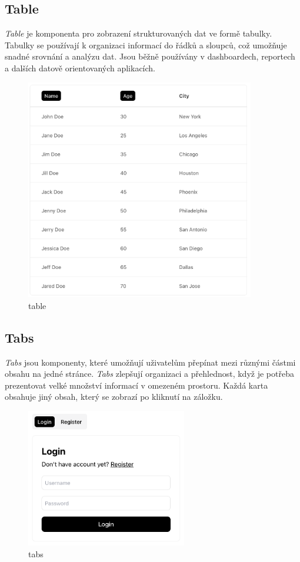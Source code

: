 \subsection{Table}
\emph{Table} je komponenta pro zobrazení strukturovaných dat ve formě tabulky. Tabulky se používají k organizaci informací do řádků a sloupců, což umožňuje snadné srovnání a analýzu dat. Jsou běžně používány v dashboardech, reportech a dalších datově orientovaných aplikacích.

\begin{figure}[H]
  \centering
  \includegraphics[width=10cm]{images/table}
  \captionsetup{justification=centering,margin=2cm}
  \caption{table} \label{picture:table}
\end{figure}

\clearpage

\subsection{Tabs}
\emph{Tabs} jsou komponenty, které umožňují uživatelům přepínat mezi různými částmi obsahu na jedné stránce. \emph{Tabs} zlepšují organizaci a přehlednost, když je potřeba prezentovat velké množství informací v omezeném prostoru. Každá karta obsahuje jiný obsah, který se zobrazí po kliknutí na záložku.

\begin{figure}[H]
  \centering
  \includegraphics[width=7cm]{images/tabs}
  \captionsetup{justification=centering,margin=2cm}
  \caption{tabs} \label{picture:tabs}
\end{figure}

